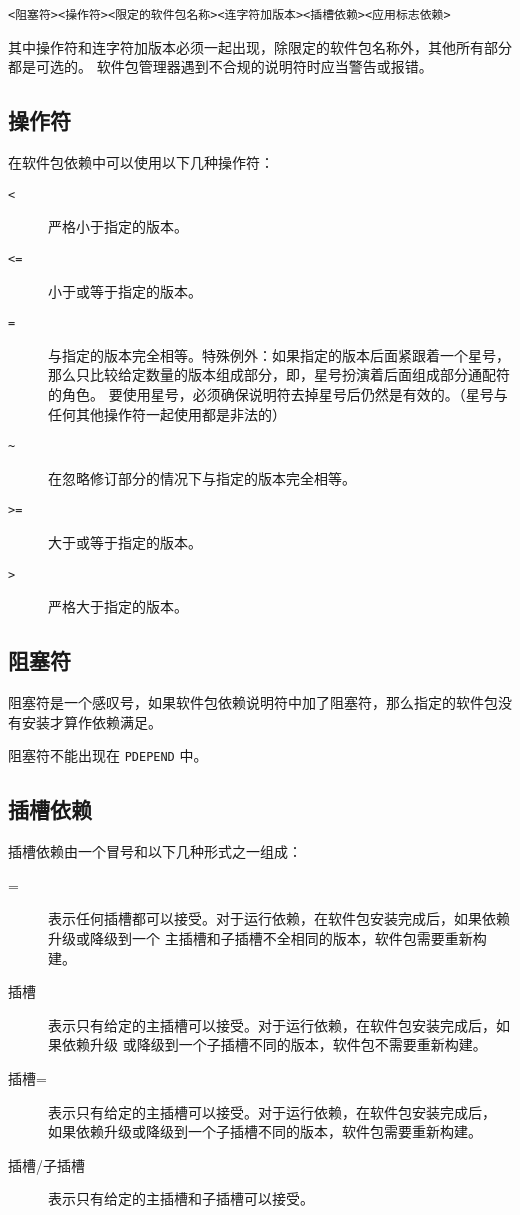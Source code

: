 \begin{verbatim}
<阻塞符><操作符><限定的软件包名称><连字符加版本><插槽依赖><应用标志依赖>
\end{verbatim}

其中操作符和连字符加版本必须一起出现，除限定的软件包名称外，其他所有部分都是可选的。
软件包管理器遇到不合规的说明符时应当警告或报错。

\subsection{操作符}
\label{sec:dep-operator}

在软件包依赖中可以使用以下几种操作符：

\begin{description}
\item[\texttt{<}] 严格小于指定的版本。
\item[\texttt{<=}] 小于或等于指定的版本。
\item[\texttt{=}] 与指定的版本完全相等。特殊例外：如果指定的版本后面紧跟着一个星号，
    那么只比较给定数量的版本组成部分，即，星号扮演着后面组成部分通配符的角色。
    要使用星号，必须确保说明符去掉星号后仍然是有效的。（星号与任何其他操作符一起使用都是非法的）
\item[\texttt{\textasciitilde}] 在忽略修订部分的情况下与指定的版本完全相等。
\item[\texttt{>=}] 大于或等于指定的版本。
\item[\texttt{>}] 严格大于指定的版本。
\end{description}

\subsection{阻塞符}

阻塞符是一个感叹号，如果软件包依赖说明符中加了阻塞符，那么指定的软件包没有安装才算作依赖满足。

阻塞符不能出现在 \texttt{PDEPEND} 中。

\subsection{插槽依赖}
\label{sec:slot-dep}

插槽依赖由一个冒号和以下几种形式之一组成：
\begin{description}
\item[=] 表示任何插槽都可以接受。对于运行依赖，在软件包安装完成后，如果依赖升级或降级到一个
    主插槽和子插槽不全相同的版本，软件包需要重新构建。
\item[插槽] 表示只有给定的主插槽可以接受。对于运行依赖，在软件包安装完成后，如果依赖升级
    或降级到一个子插槽不同的版本，软件包不需要重新构建。
\item[插槽\hspace{0em}=] 表示只有给定的主插槽可以接受。对于运行依赖，在软件包安装完成后，
    如果依赖升级或降级到一个子插槽不同的版本，软件包需要重新构建。
\item[插槽/子插槽] 表示只有给定的主插槽和子插槽可以接受。
\end{description}

